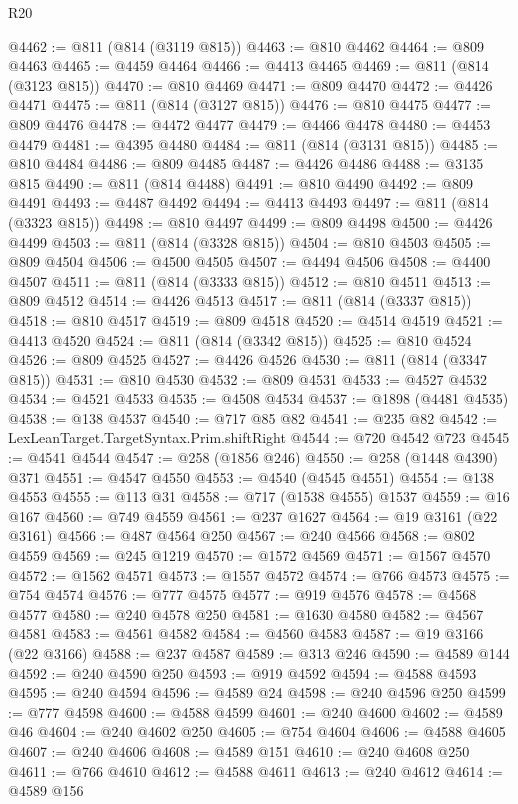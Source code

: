 \begin{lexlean}{R20}
\begin{coremodule}
{@4462 := @811 (@814 (@3119 @815))
@4463 := @810 @4462
@4464 := @809 @4463
@4465 := @4459 @4464
@4466 := @4413 @4465
@4469 := @811 (@814 (@3123 @815))
@4470 := @810 @4469
@4471 := @809 @4470
@4472 := @4426 @4471
@4475 := @811 (@814 (@3127 @815))
@4476 := @810 @4475
@4477 := @809 @4476
@4478 := @4472 @4477
@4479 := @4466 @4478
@4480 := @4453 @4479
@4481 := @4395 @4480
@4484 := @811 (@814 (@3131 @815))
@4485 := @810 @4484
@4486 := @809 @4485
@4487 := @4426 @4486
@4488 := @3135 @815
@4490 := @811 (@814 @4488)
@4491 := @810 @4490
@4492 := @809 @4491
@4493 := @4487 @4492
@4494 := @4413 @4493
@4497 := @811 (@814 (@3323 @815))
@4498 := @810 @4497
@4499 := @809 @4498
@4500 := @4426 @4499
@4503 := @811 (@814 (@3328 @815))
@4504 := @810 @4503
@4505 := @809 @4504
@4506 := @4500 @4505
@4507 := @4494 @4506
@4508 := @4400 @4507
@4511 := @811 (@814 (@3333 @815))
@4512 := @810 @4511
@4513 := @809 @4512
@4514 := @4426 @4513
@4517 := @811 (@814 (@3337 @815))
@4518 := @810 @4517
@4519 := @809 @4518
@4520 := @4514 @4519
@4521 := @4413 @4520
@4524 := @811 (@814 (@3342 @815))
@4525 := @810 @4524
@4526 := @809 @4525
@4527 := @4426 @4526
@4530 := @811 (@814 (@3347 @815))
@4531 := @810 @4530
@4532 := @809 @4531
@4533 := @4527 @4532
@4534 := @4521 @4533
@4535 := @4508 @4534
@4537 := @1898 (@4481 @4535)
@4538 := @138 @4537
@4540 := @717 @85 @82
@4541 := @235 @82
@4542 := LexLeanTarget.TargetSyntax.Prim.shiftRight
@4544 := @720 @4542 @723
@4545 := @4541 @4544
@4547 := @258 (@1856 @246)
@4550 := @258 (@1448 @4390) @371
@4551 := @4547 @4550
@4553 := @4540 (@4545 @4551)
@4554 := @138 @4553
@4555 := @113 @31
@4558 := @717 (@1538 @4555) @1537
@4559 := @16 @167
@4560 := @749 @4559
@4561 := @237 @1627
@4564 := @19 @3161 (@22 @3161)
@4566 := @487 @4564 @250
@4567 := @240 @4566
@4568 := @802 @4559
@4569 := @245 @1219
@4570 := @1572 @4569
@4571 := @1567 @4570
@4572 := @1562 @4571
@4573 := @1557 @4572
@4574 := @766 @4573
@4575 := @754 @4574
@4576 := @777 @4575
@4577 := @919 @4576
@4578 := @4568 @4577
@4580 := @240 @4578 @250
@4581 := @1630 @4580
@4582 := @4567 @4581
@4583 := @4561 @4582
@4584 := @4560 @4583
@4587 := @19 @3166 (@22 @3166)
@4588 := @237 @4587
@4589 := @313 @246
@4590 := @4589 @144
@4592 := @240 @4590 @250
@4593 := @919 @4592
@4594 := @4588 @4593
@4595 := @240 @4594
@4596 := @4589 @24
@4598 := @240 @4596 @250
@4599 := @777 @4598
@4600 := @4588 @4599
@4601 := @240 @4600
@4602 := @4589 @46
@4604 := @240 @4602 @250
@4605 := @754 @4604
@4606 := @4588 @4605
@4607 := @240 @4606
@4608 := @4589 @151
@4610 := @240 @4608 @250
@4611 := @766 @4610
@4612 := @4588 @4611
@4613 := @240 @4612
@4614 := @4589 @156
}
\end{coremodule}
\end{lexlean}
